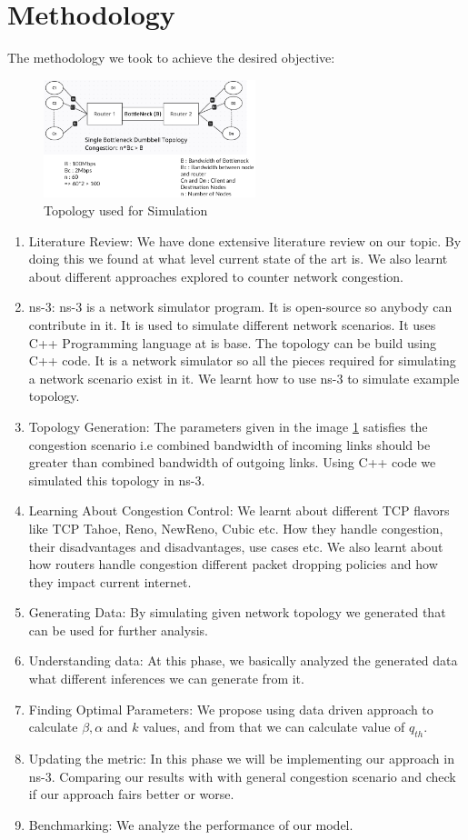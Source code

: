 \section{Methodology}
The methodology we took to achieve the desired objective:
\begin{figure}[h]
    \centering
    \includegraphics[width=0.55\textwidth]{./images/topology.png}
    \caption{\label{fig:myfig2} Topology used for Simulation}
\end{figure}
\begin{enumerate}
    \item Literature Review: We have done extensive literature review on our topic. By doing this we found at what level current state of the art is. We also learnt about different approaches explored to counter network congestion.
    \item ns-3: ns-3 is a network simulator program. It is open-source so anybody can contribute in it. It is used to simulate different network scenarios. It uses C++ Programming language at is base. The topology can be build using C++ code. It is a network simulator so all the pieces required for simulating a network scenario exist in it. We learnt how to use ns-3 to simulate example topology.
    \item Topology Generation: The parameters given in the image \ref{fig:myfig2} satisfies the congestion scenario i.e combined bandwidth of incoming links should be greater than combined bandwidth of outgoing links. Using C++ code we simulated this topology in ns-3.
    \item Learning About Congestion Control: We learnt about different TCP flavors like TCP Tahoe, Reno, NewReno, Cubic etc. How they handle congestion, their disadvantages and disadvantages, use cases etc. We also learnt about how routers handle congestion different packet dropping policies and how they impact current internet.
    \item Generating Data: By simulating given network topology we generated that can be used for further analysis.
    \item Understanding data: At this phase, we basically analyzed the generated data what different inferences we can generate from it.
    \item Finding Optimal Parameters: We propose using data driven approach to calculate \( \beta, \alpha \) and \( k \) values, and from that we can calculate value of \( q_{th} \). 
    \item Updating the metric: In this phase we will be implementing our approach in ns-3. Comparing our results with with general congestion scenario and check if our approach fairs better or worse.
    \item Benchmarking: We analyze the performance of our model.
\end{enumerate}


